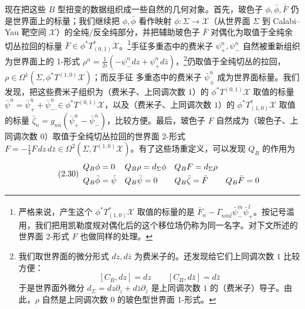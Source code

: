 现在把这些 $B$ 型扭变的数据组织成一些自然的几何对象。首先，玻色子 $\phi,\bar\phi,\bar F$ 仍是世界面上的标量；我们继续把 $\phi,\bar\phi$ 看作映射 $\phi:\Sigma\to\mathcal{X}$（从世界面 $\Sigma$ 到 Calabi--Yau 靶空间 $\mathcal{X}$）的全纯/反全纯部分，并把辅助玻色子 $\bar F$ 对偶化为取值于全纯余切丛拉回的标量 $\bar F\in\phi^*T^*_{(0,1)}\mathcal{X}$。\footnote{严格来说，产生这个 $\phi^*T^*_{(1,0)}\mathcal{X}$ 取值的标量的是 $\bar F_n-\Gamma_{n\bar m\bar l}\bar\psi^{\bar m}_-\bar\psi^{\bar l}_+$。按记号滥用，我们把用凯勒度规对偶化后的这个移位场仍称为同一名字。对下文所述的世界面 2-形式 $F$ 也做同样的处理。}手征多重态中的费米子 $\psi^n_+,\psi^n_-$ 自然被重新组织为世界面上的 1-形式 $\rho^n=\frac{1}{2i}(-\psi^n_-dz+\psi^n_+d\bar z)$，\footnote{我们取世界面的微分形式 $dz,d\bar z$ 为费米子的。还发现给它们上同调次数 $1$ 比较方便：
\[
[C_B,dz]=dz\qquad [C_B,d\bar z]=d\bar z
\]
于是世界面外微分 $d_\Sigma=dz\partial_z+d\bar z\partial_{\bar z}$ 是上同调次数 $1$ 的（费米子）导子。由此，$\rho$ 自然是上同调次数 $0$ 的玻色型世界面 1-形式。}仍取值于全纯切丛的拉回，$\rho\in\Omega^1(\Sigma,\phi^*T^{(1,0)}\mathcal{X})$；而反手征
多重态中的费米子 $\bar\psi^{\bar n}_\pm$ 成为世界面标量。我们发现，把这些费米子组织为（费米子、上同调次数 $1$）的 $\phi^*T^{(0,1)}\mathcal{X}$ 取值的标量 $\bar\psi^{\bar n}=\bar\psi^{\bar n}_++\bar\psi^{\bar n}_-\in\phi^*T^{(0,1)}\mathcal{X}$，以及（费米子、上同调次数 $1$）的 $\phi^*T^*_{(1,0)}\mathcal{X}$ 取值的标量 $\bar\zeta_n=g_{n\bar n}(\bar\psi^{\bar n}_+-\bar\psi^{\bar n}_-)$，比较方便。最后，玻色子 $F$ 自然成为（玻色子、上同调次数 $0$）取值于全纯切丛拉回的世界面 2-形式 $F=-\frac14F\,dz\,d\bar z\in\Omega^2(\Sigma,T^{(1,0)}\mathcal{X})$。有了这些场重定义，可以发现 $Q_B$ 的作用为
\begin{equation}\tag{2.30}
\begin{array}{l@{\quad}l@{\quad}l@{\quad}l}
Q_B\phi=0 & Q_B\rho=d_\Sigma\phi & Q_B F=d_\Sigma\rho & \\[4pt]
Q_B\bar\phi=\bar\psi & Q_B\bar\psi=0 & Q_B\bar\zeta=\bar F & Q_B\bar F=0
\end{array}
\end{equation}
